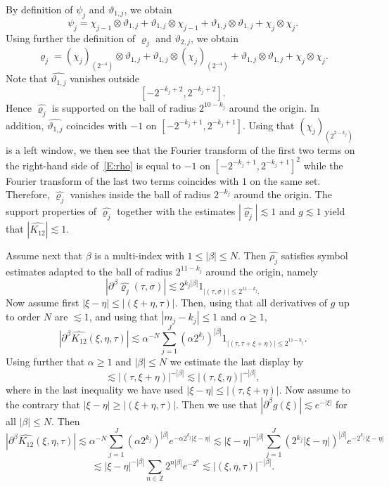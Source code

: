 \documentclass[12pt,reqno]{amsart}
\theoremstyle{plain}
\theoremstyle{definition}
\numberwithin{equation}{section}
\newcommand{\Z}{{\mathbb Z}}
\def\wh{\widehat}
\begin{document}
By definition of $\psi_j$ and $\vartheta_{1,j}$, we obtain
\[
\psi_j=\chi_{j-1}\otimes \vartheta_{1,j}
+ \vartheta_{1,j}\otimes \chi_{j-1}+
\vartheta_{1,j}\otimes \vartheta_{1,j}   + {\chi_{j}}\otimes {\chi_{j}}  . \]
Using further the definition of $\varrho_j$ and $\vartheta_{2,j}$, we obtain
\begin{equation}\label{E:rho}
\varrho_j=(\chi_{j})_{(2^{-4})} \otimes \vartheta_{1,j}
+ \vartheta_{1,j}\otimes (\chi_{j})_{(2^{-4})}+
\vartheta_{1,j}\otimes \vartheta_{1,j}   + {\chi_{j}}\otimes {\chi_{j}}.
\end{equation}
Note that $\widehat{\vartheta_{1,j}}$ vanishes outside 
\[[-2^{-k_j+2},2^{-k_j+2}]. \]
Hence $\widehat{\varrho_j}$ is supported on the ball of radius
$2^{10-k_j}$ around the origin. 
In addition, $\wh{\vartheta_{1,j}}$ coincides with $-1$ on $[-2^{-k_j+1},2^{-k_j+1}]$. Using that $(\chi_j)_{(2^{2-k_j})}$ is a left window, we then see that the Fourier transform of the first two terms on the right-hand side of~\eqref{E:rho} is equal to $-1$ on $[-2^{-k_j+1},2^{-k_j+1}]^2$ while the Fourier transform of the last two terms coincides with $1$ on the same set. Therefore,  $\wh{\varrho_j}$ vanishes inside the ball of radius $2^{-k_j}$ around the origin. The support properties of $\wh{\varrho_j}$ together with the estimates $|\wh{\varrho_j}| \lesssim 1$ and $g \lesssim 1$ yield that $|\wh{K_{12}}| \lesssim 1$.

Assume next that $\beta$ is a multi-index with $1\le |\beta|\le N$.
Then $\wh{\rho_j}$ satisfies symbol
estimates adapted to the ball of radius $2^{11-k_j}$ around the origin, namely
\[
|\partial^\beta \wh{\varrho_j}(\tau,\sigma)| \lesssim 2^{k_j|\beta|} 1_{|(\tau,\sigma)| \le 2^{11-k_j}.}
\]
Now assume first $|\xi-\eta|\le |(\xi+\eta,\tau)|.$
Then, using that all derivatives of $g$ up to order $N$
are $\lesssim 1$, and using that $|m_j-k_j|\le 1$ and
$\alpha \geq 1$,
\[|\partial^\beta \widehat{K_{12}}(\xi,\eta,\tau)|\lesssim \alpha^{-N} \sum_{j=1}^J(\alpha 2^{k_j})^{|\beta|} 1_{|(\tau,\tau+\xi+\eta)|\le 2^{11-k_j}}.\]
Using further that $\alpha\ge 1$ and $|\beta| \le N$
we estimate the last display by
\[\lesssim |(\tau,\xi+\eta)|^{-|\beta|}\lesssim |(\tau,\xi,\eta)|^{-|\beta|},\]
where in the last inequality we have used $|\xi-\eta|\le |(\tau, \xi+\eta)|$.
Now assume to the contrary that $|\xi-\eta|\ge |(\xi+\eta,\tau)|.$
Then we use that $|\partial^\beta g(\xi)|\lesssim e^{-|\xi|}$
for all $|\beta|\le N$. Then
\[|\partial^\beta \widehat{K_{12}}(\xi,\eta,\tau)|\lesssim \alpha^{-N} \sum_{j=1}^J(\alpha 2^{k_j})^{|\beta|} e^{-\alpha 2^{k_j}|\xi-\eta|} \lesssim  |\xi-\eta|^{-|\beta| }\sum_{j=1}^J(2^{k_j}|\xi-\eta|)^{|\beta|} e^{ -2^{k_j}|\xi-\eta|}\]
\[\lesssim |\xi-\eta|^{-|\beta|}\sum_{n\in \Z} 2^{n|\beta|}e^{-2^n}
\lesssim |(\xi,\eta,\tau)|^{-|\beta|}.\]
\end{document}
